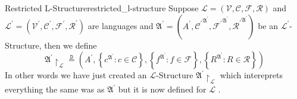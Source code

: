 \begin{definition}{Restricted L-Structure}{restricted_l-structure}
    Suppose $ \mathcal{ L } =  \left( \mathcal{ V } , \mathcal{ C } , \mathcal{ F } , \mathcal{ R }       \right)    $ and $ \mathcal{ L } ^{ \prime  } =  \left( \mathcal{ V } ^{ \prime  }  , \mathcal{ C } ^{ \prime  }  , \mathcal{ F } ^{  \prime  }  , \mathcal{ R } ^{ \prime  }        \right)   $  are languages and $ \mathfrak{A} ^{ \prime  } =\left(A ^{ \prime  } , \mathcal{ C ^{ \prime  }  } ^{ \mathfrak{ A } ^{\prime} }  , \mathcal{ F ^{ \prime  }  } ^{ \mathfrak{ A } ^{\prime}   },\mathcal{ R ^{ \prime  }  } ^{ \mathfrak{ A } ^{\prime}   }         \right)   $ be an $\mathcal{L} ^{  \prime  } $-Structure, then we define 
    \[
        \mathfrak{A} ^{ \prime  } \upharpoonright_{\mathcal{L}} \stackrel{\mathtt{D}}{=} \left( A ^{ \prime  } ,  \left\{ c ^{ \mathfrak{ A } ^{ \prime  }    } : c \in  \mathcal{ C }   \right\}, \left\{ f ^{ \mathfrak{ A } ^{ \prime  }    } : f \in  \mathcal{ F }   \right\}, \left\{ R ^{ \mathfrak{ A } ^{ \prime  }    } : R \in  \mathcal{ R }   \right\}     \right)  
    \]
    In other words we have just created an $\mathcal{L}$-Structure $ \mathfrak{ A } ^{ \prime  } \upharpoonright_{\mathcal{L}} $ which intereprets everything the same was as $ \mathfrak{ A } ^{ \prime  }   $ but it is now defined for $ \mathcal{ L }   $ .
\end{definition}
